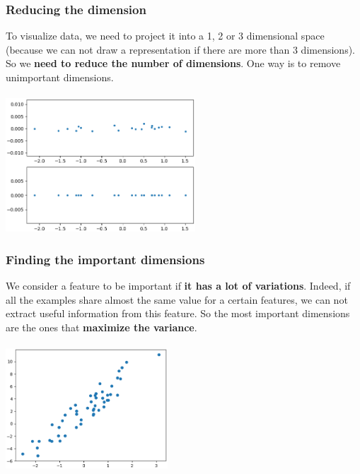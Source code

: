 \documentclass{beamer}
\begin{document}
\begin{frame}
  \frametitle{Reducing the dimension}
  To visualize data, we need to project it into a 1, 2 or 3 dimensional space
  (because we can not draw a representation if there are more than 3
  dimensions). So we \textbf{need to reduce the number of dimensions}. One way
  is to remove unimportant dimensions.\\~\\

  \centering
  \includegraphics[height=5cm]{img/pca_bef-aft.png}
\end{frame}

\begin{frame}
  \frametitle{Finding the important dimensions}
  We consider a feature to be important if \textbf{it has a lot of variations}.
  Indeed, if all the examples share almost the same value for a certain
  features, we can not extract useful information from this feature.  So the
  most important dimensions are the ones that \textbf{maximize the variance}.
  \\~\\
  \centering
  \includegraphics[height=4.5cm]{img/pca_2dim.png}
\end{frame}
\end{document}
